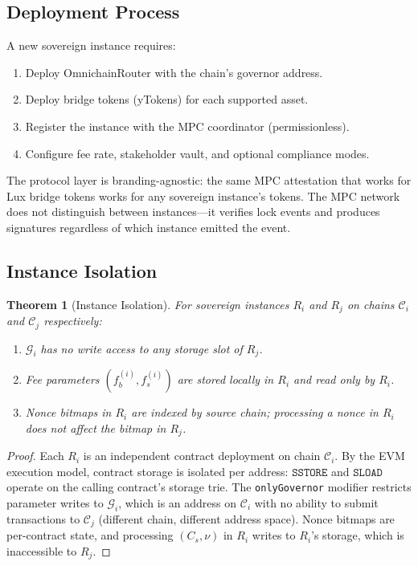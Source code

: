 \documentclass[11pt,twocolumn]{article}
\newtheorem{theorem}{Theorem}[section]
\theoremstyle{definition}
\newcommand{\Gov}{\mathcal{G}}
\newcommand{\Chain}{\mathcal{C}}
\begin{document}
\subsection{Deployment Process}

A new sovereign instance requires:

\begin{enumerate}[nosep]
  \item Deploy OmnichainRouter with the chain's governor address.
  \item Deploy bridge tokens (yTokens) for each supported asset.
  \item Register the instance with the MPC coordinator (permissionless).
  \item Configure fee rate, stakeholder vault, and optional compliance modes.
\end{enumerate}

The protocol layer is branding-agnostic: the same MPC attestation that works for Lux bridge tokens works for any sovereign instance's tokens. The MPC network does not distinguish between instances---it verifies lock events and produces signatures regardless of which instance emitted the event.

\subsection{Instance Isolation}

\begin{theorem}[Instance Isolation]
\label{thm:instance}
For sovereign instances $R_i$ and $R_j$ on chains $\Chain_i$ and $\Chain_j$ respectively:
\begin{enumerate}[nosep]
  \item $\Gov_i$ has no write access to any storage slot of $R_j$.
  \item Fee parameters $(f_b^{(i)}, f_s^{(i)})$ are stored locally in $R_i$ and read only by $R_i$.
  \item Nonce bitmaps in $R_i$ are indexed by source chain; processing a nonce in $R_i$ does not affect the bitmap in $R_j$.
\end{enumerate}
\end{theorem}

\begin{proof}
Each $R_i$ is an independent contract deployment on chain $\Chain_i$. By the EVM execution model, contract storage is isolated per address: $\texttt{SSTORE}$ and $\texttt{SLOAD}$ operate on the calling contract's storage trie. The \texttt{onlyGovernor} modifier restricts parameter writes to $\Gov_i$, which is an address on $\Chain_i$ with no ability to submit transactions to $\Chain_j$ (different chain, different address space). Nonce bitmaps are per-contract state, and processing $(C_s, \nu)$ in $R_i$ writes to $R_i$'s storage, which is inaccessible to $R_j$.
\end{proof}
\end{document}
